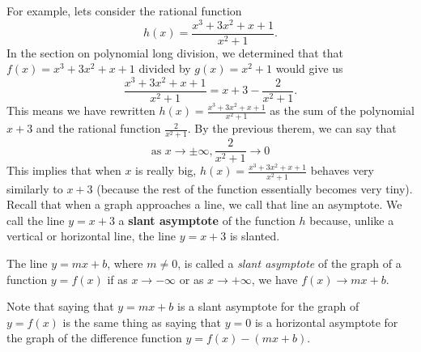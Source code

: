 \documentclass{ximera}
\begin{document}
\begin{example}
For example, lets consider the rational function $$h(x) = \frac{x^3+3x^2+x+1}{x^2+1}.$$  In the section on polynomial long division, we determined that that $f(x) = x^3+3x^2+x+1$ divided by $g(x) = x^2+1$ would give us 
$$  \frac{x^3+3x^2+x+1}{x^2+1} = x+3 - \frac{2}{x^2+1}.  $$
This means we have rewritten $h(x) = \frac{x^3+3x^2+x+1}{x^2+1}$ as the sum of the polynomial $x+3$ and the rational function $\frac{2}{x^2+1}$.  By the previous therem, we can say that
\[
\text{as } x \rightarrow \pm \infty, \frac{2}{x^2+1} \rightarrow 0
\]
This implies that when $x$ is really big, $h(x) = \frac{x^3+3x^2+x+1}{x^2+1}$ behaves very similarly to $x+3$ (because the rest of the function essentially becomes very tiny).   Recall that when a graph approaches a line, we call that line an asymptote.  We call the line $y=x+3$ a \textbf{slant asymptote} of the function $h$ because, unlike a vertical or horizontal line, the line $y=x+3$ is slanted.
\end{example}

\begin{definition}
  The line $y=mx+b$, where $m\neq 0$, is called a \emph{slant asymptote} of the graph of a function $y=f(x)$ if as $x \to -\infty$ or as $x\to +\infty$, we have $f(x) \to mx+b$.
\end{definition}

Note that saying that $y=mx+b$ is a slant asymptote for the graph of $y=f(x)$ is the same thing as saying that $y=0$ is a horizontal asymptote for the graph of the difference function $y=f(x)-(mx+b)$.
\end{document}
